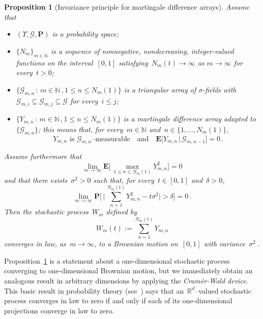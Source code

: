 \documentclass[11pt]{article} %
\numberwithin{equation}{section}
\newtheorem{proposition}[theorem]{Proposition}
\theoremstyle{definition}
\newcommand*{\N}{\ensuremath{\mathbb{N}}}
\newcommand*{\Rd}{\ensuremath{\mathbb{R}^d}}
\begin{document}
\begin{proposition}[Invariance principle for martingale difference arrays]
\label{p.MFCLT}
Assume that 
\begin{itemize}

\item $(\Upsilon, \mathcal{G},\mathbf{P})$ is a probability space;

\item $\{ N_m \}_{m\in\N}$ is a sequence of nonnegative, nondecreasing, integer-valued functions on the interval~$[0,1]$ satisfying~$N_m(t) \to \infty$ as $m\to \infty$ for every~$t>0$;

\item $\{ \mathcal{G}_{m,n} \,:\, m\in\N\,,  1 \leq n \leq N_m(1) \}$ is a triangular array of $\sigma$-fields with~$\mathcal{G}_{m,i} \subseteq \mathcal{G}_{m,j} \subseteq \mathcal{G}$ for every~$i \leq j$;

\item $\{ Y_{m,n} \,:\, m\in\N\,,  1 \leq n \leq N_m(1) \}$ is a martingale difference array adapted to~$\{ \mathcal{G}_{m,n} \}$; this means that, for every~$m\in\N$ and~$n\in\{1,\ldots,N_m(1) \}$, 
\begin{equation}
\label{e.MDA}
\mbox{$Y_{m,n}$ is~$\mathcal{G}_{m,n}$--measurable} 
\quad \mbox{and} \quad
\mbox{$\mathbf{E} \bigl[ Y_{m,n} \,|\, \mathcal{G}_{m,n-1} \bigr] = 0$}\,.
\end{equation}
\end{itemize}
Assume furthermore that
\begin{equation}
\label{e.invcond2}
\lim_{m\to \infty} 
\mathbf{E} \biggl[ \,
\max_{1\leq n \leq N_m(1)} 
Y_{m,n}^2
\biggr] = 0
\end{equation}
and that there exists~$\sigma^2>0$ such that, for every~$t \in [0,1]$ and~$\delta>0$,
\begin{equation}
\label{e.invcond1}
\lim_{m\to \infty} 
\mathbf{P} \Biggl[ \,
\biggl| \,
\sum_{n=1}^{N_m(t) }
Y_{m,n}^2 
- t\sigma^2
\biggr| > \delta
\Biggr] = 0\,.
\end{equation}
Then the stochastic process~$W_m$ defined by
\begin{equation*}
W_{m} (t) := \sum_{n=1}^{N_m(t)} Y_{m,n} 
\end{equation*}
converges in law, as~$m\to \infty$, to a Brownian motion on~$[0,1]$ with variance~$\sigma^2$\,.
\end{proposition}

Proposition~\ref{p.MFCLT} is a statement about a one-dimensional stochastic process converging to one-dimensional Brownian motion, but we immediately obtain an analogous result in arbitrary dimensions by applying the \emph{Cram\'er-Wold device}. This basic result in probability theory (see~\cite[Theorem 29.4]{Bill}) says that an~$\Rd$--valued stochastic process converges in law to zero if and only if each of its one-dimensional projections converge in law to zero.
\end{document}

